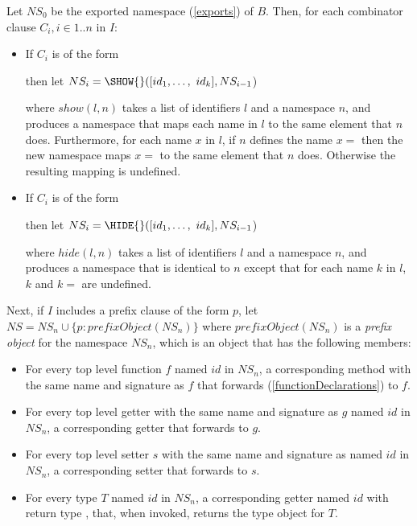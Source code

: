 \documentclass{article}
\begin{document}
\LMHash{}
Let $NS_0$ be the exported namespace (\ref{exports}) of $B$.
Then, for each combinator clause $C_i, i \in 1 .. n$ in $I$:
\begin{itemize}
\item If $C_i$ is of the form


then let $NS_i = \SHOW{}([id_1, \ldots,\ id_k], NS_{i-1}$)

where $show(l,n)$ takes a list of identifiers $l$ and a namespace $n$, and produces a namespace that maps each name in $l$ to the same element that $n$ does.
Furthermore, for each name $x$ in $l$, if $n$ defines the name $x=$ then the new namespace maps $x=$ to the same element that $n$ does.
Otherwise the resulting mapping is undefined.

\item If $C_i$ is of the form


then let $NS_i = \HIDE{}([id_1, \ldots,\ id_k], NS_{i-1}$)

where $hide(l, n)$ takes a list of identifiers $l$ and a namespace $n$, and produces a namespace that is identical to $n$ except that for each name $k$ in $l$, $k$ and $k=$ are undefined.
\end{itemize}

\LMHash{}
Next, if $I$ includes a prefix clause of the form \AS{} $p$, let $NS = NS_n \cup \{p: prefixObject(NS_n)\}$ where $prefixObject(NS_n)$ is a {\em prefix object} for the namespace $NS_n$, which is an object that has the following members:

\begin{itemize}
\item For every top level function $f$ named $id$ in $NS_n$, a corresponding method with the same name and signature as $f$ that forwards (\ref{functionDeclarations}) to $f$.
\item For every top level getter with the same name and signature as $g$ named $id$ in $NS_n$, a corresponding getter that forwards to $g$.
\item For every top level setter $s$ with the same name and signature as named $id$ in $NS_n$, a corresponding setter that forwards to $s$.
\item For every type $T$ named $id$ in $NS_n$, a corresponding getter named $id$ with return type , that, when invoked, returns the type object for $T$.
\end{itemize}
\end{document}
